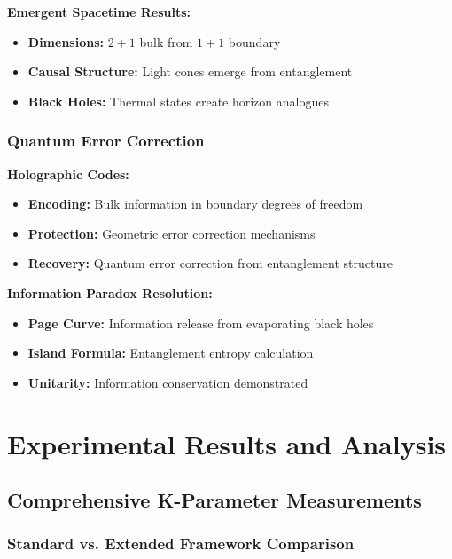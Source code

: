 \documentclass[11pt,a4paper,twoside]{article}
\begin{document}
\textbf{Emergent Spacetime Results:}
\begin{itemize}[leftmargin=*]
    \item \textbf{Dimensions:} $2+1$ bulk from $1+1$ boundary
    \item \textbf{Causal Structure:} Light cones emerge from entanglement
    \item \textbf{Black Holes:} Thermal states create horizon analogues
\end{itemize}

\subsubsection{Quantum Error Correction}

\textbf{Holographic Codes:}
\begin{itemize}[leftmargin=*]
    \item \textbf{Encoding:} Bulk information in boundary degrees of freedom
    \item \textbf{Protection:} Geometric error correction mechanisms
    \item \textbf{Recovery:} Quantum error correction from entanglement structure
\end{itemize}

\textbf{Information Paradox Resolution:}
\begin{itemize}[leftmargin=*]
    \item \textbf{Page Curve:} Information release from evaporating black holes
    \item \textbf{Island Formula:} Entanglement entropy calculation
    \item \textbf{Unitarity:} Information conservation demonstrated
\end{itemize}

\section{Experimental Results and Analysis}

\subsection{Comprehensive K-Parameter Measurements}

\subsubsection{Standard vs. Extended Framework Comparison}
\end{document}
